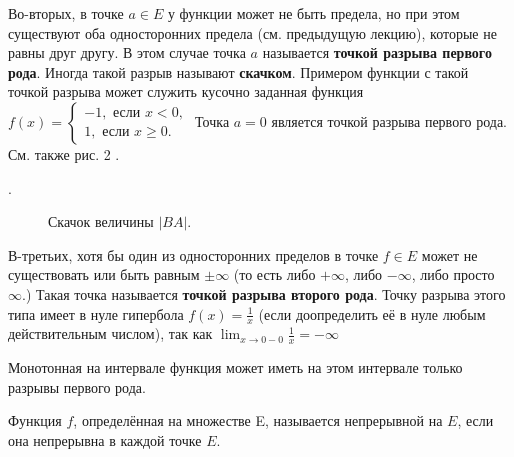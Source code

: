 Во-вторых, в точке $a \in E$ у функции может не быть предела, но при этом существуют оба односторонних предела (см. предыдущую лекцию), которые не равны друг другу. В этом случае точка $a$ называется \textbf{точкой разрыва первого рода}. Иногда такой разрыв называют \textbf{скачком}. Примером функции с такой точкой разрыва может служить кусочно заданная функция $f(x)=\left\{\begin{array}{l}-1, \text { если } x<0, \\ 1, \text { если } x \geq 0 .\end{array}\right.$ Точка $a=0$ является точкой разрыва первого рода. См. также рис. 2 .

. \begin{figure}[h!]
    \caption{Скачок величины $|BA|$.}
    \label{fig:image}
\end{figure}

В-третьих, хотя бы один из односторонних пределов в точке $f \in E$ может не существовать или быть равным $\pm \infty$ (то есть либо $+\infty$, либо $-\infty$, либо просто $\infty$.) Такая точка называется \textbf{точкой разрыва второго рода}. Точку разрыва этого типа имеет в нуле гипербола $f(x)=\frac{1}{x}$ (если доопределить её в нуле любым действительным числом), так как $\lim _{x \rightarrow 0-0} \frac{1}{x}=-\infty$
\begin{proposition}
    Монотонная на интервале функция может иметь на этом интервале только разрывы первого рода.
\end{proposition}

\begin{definition}
    Функция $f$, определённая на множестве E, называется непрерывной на $E$, если она непрерывна в каждой точке $E$.
\end{definition}


